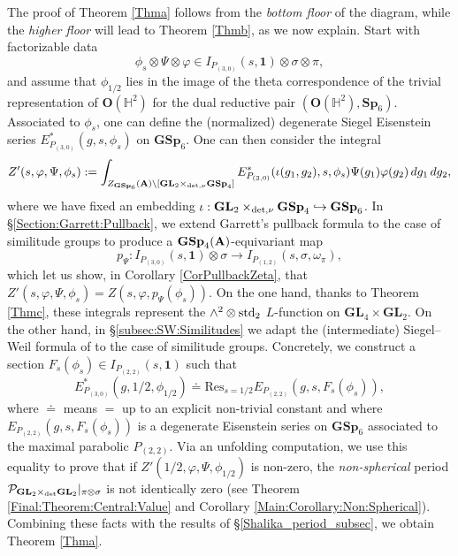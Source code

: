 \documentclass[11pt, reqno]{amsart}
\theoremstyle{plain}
\theoremstyle{definition}
\theoremstyle{remark}
\theoremstyle{plain}
\def\A{{\bf A}}
\def\GSp{{\mathbf{GSp}}}
\def\Sp{{\mathbf{Sp}}}
\def\GL{\mathbf{GL}}
\begin{document}
 The proof of Theorem \ref{Thma} follows from the \emph{bottom floor} of the diagram, while the \emph{higher floor} will lead to Theorem \ref{Thmb}, as we now explain.  Start with factorizable data \[\phi_s\otimes\Psi\otimes \varphi \in  I_{P_{(3,0)}}(s,\mathbf{1})\otimes \sigma \otimes \pi,\] and assume that $\phi_{1/2}$ lies in the image of the theta correspondence of the trivial representation of $\mathbf{O}(\mathbb{H}^2)$ for the dual reductive pair $(\mathbf{O}(\mathbb{H}^2),\Sp_6)$. Associated to $\phi_s$, one can define the (normalized) degenerate Siegel Eisenstein series $E_{P_{(3,0)}}^*(g, s,\phi_s)$ on $\GSp_6$. One can then consider the integral 
\[Z'(s,\varphi, \Psi, \phi_s) := \int_{Z_{\GSp_6}(\A)\backslash [\GL_2\times_{{\rm det},\nu} \GSp_4]} E_{P_{(3,0)}}^*(\iota( g_1  , g_2), s,\phi_s) \Psi(g_1 ) \varphi(g_2)\, dg_1\,dg_2,\]
where we have fixed an embedding $\iota: \GL_2\times_{{\rm det},\nu} \GSp_4 \hookrightarrow \GSp_6$. In \S \ref{Section:Garrett:Pullback}, we extend Garrett's pullback formula to the case of similitude groups to produce a $\GSp_4(\A)$-equivariant map $$p_{\Psi}:I_{P_{(3,0)}}(s,\mathbf{1})\otimes \sigma \to   I_{P_{(1,2)}}(s,\sigma,\omega_{\pi}),$$
which let us show, in Corollary \ref{CorPullbackZeta}, that 
$Z'(s,\varphi, \Psi, \phi_s) = Z(s, \varphi, p_\Psi(\phi_s)).$
On the one hand, thanks to Theorem \ref{Thmc}, these integrals represent the $\wedge^2 \otimes {\rm std}_2$ $L$-function on $\GL_4 \times \GL_2$. On the other hand, in \S\ref{subsec:SW:Similitudes} we adapt the (intermediate) Siegel--Weil formula of \cite[Theorem 6.12]{KudlaRallis} to the case of similitude groups. Concretely, we construct a section $F_s(\phi_s)\in I_{P_{(2,2)}}(s,\mathbf{1})$ such that $$E_{P_{(3,0)}}^*(g, 1/2,\phi_{1/2}) \doteq \mathrm{Res}_{s = 1/2}E_{P_{(2,2)}}(g, s, F_s(\phi_{s})),$$ where $\doteq$ means $=$ up to an explicit non-trivial constant and where $E_{P_{(2,2)}}(g, s, F_s(\phi_{s}))$ is a degenerate Eisenstein series on $\GSp_6$ associated to the maximal parabolic $P_{(2,2)}$. Via an unfolding computation, we use this equality to prove that if $Z'(1/2,\varphi, \Psi, \phi_{1/2})$ is non-zero, the \emph{non-spherical} period $\mathcal{P}_{\GL_2 \times_{\rm det} \GL_2}|_{\pi\otimes \sigma}$ is not identically zero (see Theorem \ref{Final:Theorem:Central:Value} and Corollary \ref{Main:Corollary:Non:Spherical}). Combining these facts with the results of \S \ref{Shalika_period_subsec}, we obtain Theorem \ref{Thma}.
 \\
\end{document}
